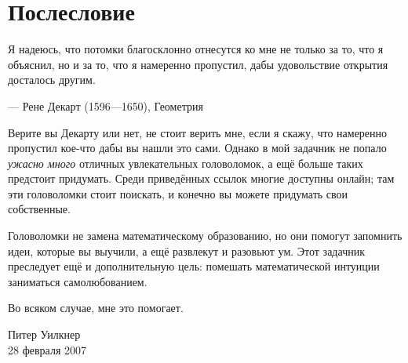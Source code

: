 \chapter{Послесловие}


\setlength{\epigraphwidth}{.83\textwidth}
\epigraph{Я надеюсь, что потомки благосклонно отнесутся ко мне не только за то, что я объяснил, но и за то, что я намеренно пропустил, дабы удовольствие открытия досталось другим.}{--- Рене Декарт (1596---1650), Геометрия}


Верите вы Декарту или нет, не стоит верить мне, если я скажу, что намеренно пропустил кое-что дабы вы нашли это сами.
Однако в мой задачник не попало \emph{ужасно много} отличных увлекательных головоломок, а ещё больше таких предстоит придумать.
Среди приведённых ссылок многие доступны онлайн; там эти головоломки стоит поискать,
и конечно вы можете придумать свои собственные.

Головоломки не замена математическому образованию, но они помогут запомнить идеи, которые вы выучили, а ещё развлекут и разовьют ум.
Этот задачник преследует ещё и дополнительную цель:
помешать математической интуиции заниматься самолюбованием.

Во всяком случае, мне это помогает.

\begin{flushright}
Питер Уилкнер\\
28 февраля 2007
\end{flushright}
